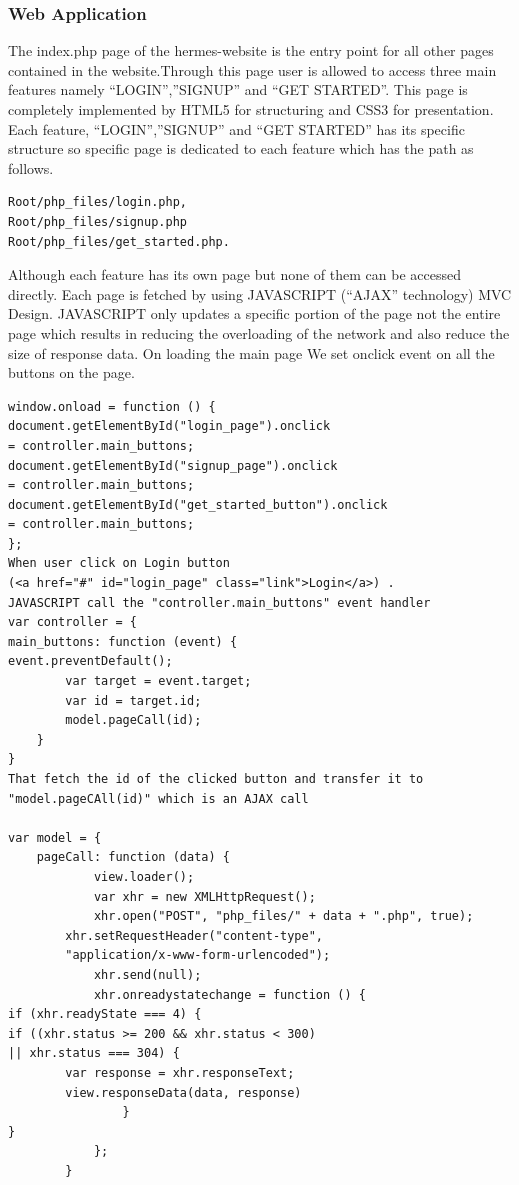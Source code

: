 \documentclass{article}
\begin{document}
\subsubsection{Web Application}
The index.php page of the hermes-website  is the entry point for all other pages contained in the website.Through this page user is allowed to access three main features namely “LOGIN”,”SIGNUP” and “GET STARTED”. This page is completely implemented by HTML5 for structuring and CSS3 for presentation. Each feature, “LOGIN”,”SIGNUP” and “GET STARTED” has its specific structure so specific page is dedicated  to each feature which has the path as follows. \par
\begin{lstlisting}
Root/php_files/login.php,
Root/php_files/signup.php
Root/php_files/get_started.php. 
\end{lstlisting}
Although each feature has its own page but none of them can be accessed directly. Each page is fetched by using  JAVASCRIPT (“AJAX” technology) MVC Design. 
JAVASCRIPT only updates a specific portion of the page not the entire page which results in reducing the overloading of the network and also reduce the size of response data.
On loading the main page We set  onclick event on all the buttons on the page. \par
\begin{lstlisting}
window.onload = function () {
document.getElementById("login_page").onclick 
= controller.main_buttons;
document.getElementById("signup_page").onclick 
= controller.main_buttons;
document.getElementById("get_started_button").onclick 
= controller.main_buttons;
};
When user click on Login button 
(<a href="#" id="login_page" class="link">Login</a>) . 
JAVASCRIPT call the "controller.main_buttons" event handler
var controller = {
main_buttons: function (event) {
event.preventDefault();
		var target = event.target;
		var id = target.id;
		model.pageCall(id);
	}
}
That fetch the id of the clicked button and transfer it to 
"model.pageCAll(id)" which is an AJAX call

var model = {
	pageCall: function (data) {
			view.loader();
			var xhr = new XMLHttpRequest();
			xhr.open("POST", "php_files/" + data + ".php", true);
		xhr.setRequestHeader("content-type",
		"application/x-www-form-urlencoded");
			xhr.send(null);
			xhr.onreadystatechange = function () {
if (xhr.readyState === 4) {
if ((xhr.status >= 200 && xhr.status < 300) 
|| xhr.status === 304) {
		var response = xhr.responseText;
		view.responseData(data, response)
				}
}	
			};
		}  
\end{lstlisting}
\end{document}
